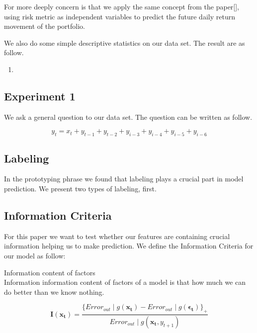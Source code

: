     For more deeply concern is that we apply the same concept from the paper[], using risk metric as independent variables to predict the future daily return movement of the portfolio.
    
    We also do some simple descriptive statistics on our data set. The result are as follow.
    

\begin{enumerate}
\item{}
\end{enumerate}


\subsection{Experiment 1}
    We ask a general question to our data set. The question can be written as follow.

$$ y_{t} = x_{t} + y_{t-1} +y_{t-2} + y_{i-3} +y_{i-4}+ y_{i-5}+
y_{i-6}$$

\subsection{Labeling}
    In the prototyping phrase we found that labeling plays a crucial part in model prediction. 
We present two types of labeling, first.

\subsection{Information Criteria}

    For this paper we want to test whether our features are containing crucial information helping us to make prediction.
We define the Information Criteria for our model as follow:
\newpage

\begin{defn}
Information content of factors\\
Information information content of factors of a model is that how much we can do better than we know nothing.
\end{defn}

\[
\mathbf{I}(\mathbf{x_t}) = \frac{\{ Error_{out} \mid g(\mathbf{x_{t}}) - Error_{out} \mid g(\mathbf{\epsilon_{t}})\}_{+}}
{Error_{out} \mid g(\mathbf{x_{t}},y_{t+1})}
\]

